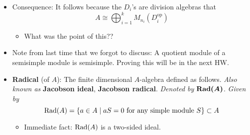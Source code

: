 \documentclass[../notes.tex]{subfiles}
\begin{document}
\begin{itemize}
\begin{proof}
\begin{equation*}
            = \bigoplus_{i,j=1}^k\Hom_A(S_i^{n_i},S_j^{n_j})
        \end{equation*}
        By Schur's lemma for associative algebras,
        \begin{equation*}
            \Hom_A(S_i,S_j) =
            \begin{cases}
                0 & i\neq j\\
                D_i & i=j
            \end{cases}
        \end{equation*}
        where each $D_i$ is a division algebra. Thus, continuing from the above,
        \begin{equation*}
            A^\text{op} \cong \bigoplus_{i=1}^k\Hom_A(S_i^{n_i},S_i^{n_i})
            = \bigoplus_{i=1}^kM_{n_i}(\Hom_A(S_i,S_i))
            = \bigoplus_{i=1}^kM_{n_i}(D_i)
        \end{equation*}
        Note that $\Hom_A(S_i^{n_i},S_i^{n_i})=M_{n_i}(\Hom_A(S_i,S_i))$ because of the thing about homomorphisms of direct sums of modules equaling matrices of homomorphisms. This was discussed on Monday. We don't include any $\Hom_A(S_i,S_j)$ because all of these are equal to zero; indeed, it appears that these matrices will be strictly diagonal.
    \end{proof}
    \item Consequence: It follows because the $D_i$'s are division algebras that
    \begin{equation*}
        A \cong \bigoplus_{i=1}^kM_{n_i}(D_i^\text{op})
    \end{equation*}
    \begin{itemize}
        \item What was the point of this??
    \end{itemize}
    \item Note from last time that we forgot to discuss: A quotient module of a semisimple module is semisimple. Proving this will be in the next HW.
    \item \textbf{Radical} (of $A$): The finite dimensional $A$-algebra defined as follows. \emph{Also known as} \textbf{Jacobson ideal}, \textbf{Jacobson radical}. %
    \emph{Denoted by} $\bm{\Rad(A)}$. \emph{Given by}
    \begin{equation*}
        \operatorname{Rad}(A) = \{a\in A\mid aS=0\text{ for any simple module }S\} \subset A
    \end{equation*}
    \begin{itemize}
        \item Immediate fact: $\operatorname{Rad}(A)$ is a two-sided ideal.

\end{itemize}
\end{itemize}
\end{document}
